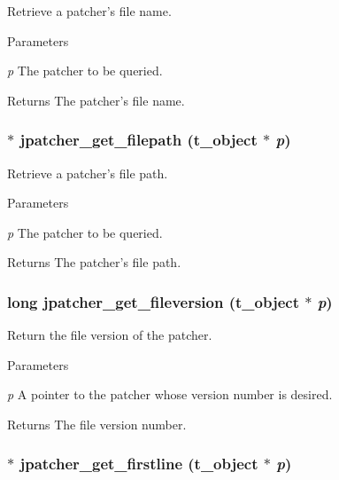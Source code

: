 Retrieve a patcher's file name. 
\begin{DoxyParams}{Parameters}
\item[{\em p}]The patcher to be queried. \end{DoxyParams}
\begin{DoxyReturn}{Returns}
The patcher's file name. 
\end{DoxyReturn}
\hypertarget{group__jpatcher_gac278d621dc1eef9e3b0dbddfc6bf3f53}{
\subsubsection[{jpatcher\_\-get\_\-filepath}]{$\ast$ jpatcher\_\-get\_\-filepath ({\bf t\_\-object} $\ast$ {\em p})}}
\label{group__jpatcher_gac278d621dc1eef9e3b0dbddfc6bf3f53}


Retrieve a patcher's file path. 
\begin{DoxyParams}{Parameters}
\item[{\em p}]The patcher to be queried. \end{DoxyParams}
\begin{DoxyReturn}{Returns}
The patcher's file path. 
\end{DoxyReturn}
\hypertarget{group__jpatcher_gaac7f1696b3346197cb8f1c0dac954780}{
\subsubsection[{jpatcher\_\-get\_\-fileversion}]{\setlength{\rightskip}{0pt plus 5cm}long jpatcher\_\-get\_\-fileversion ({\bf t\_\-object} $\ast$ {\em p})}}
\label{group__jpatcher_gaac7f1696b3346197cb8f1c0dac954780}


Return the file version of the patcher. 
\begin{DoxyParams}{Parameters}
\item[{\em p}]A pointer to the patcher whose version number is desired. \end{DoxyParams}
\begin{DoxyReturn}{Returns}
The file version number. 
\end{DoxyReturn}
\hypertarget{group__jpatcher_ga5d110fdbf8797e9d0edfa1e47afdc691}{
\subsubsection[{jpatcher\_\-get\_\-firstline}]{$\ast$ jpatcher\_\-get\_\-firstline ({\bf t\_\-object} $\ast$ {\em p})}}
\label{group__jpatcher_ga5d110fdbf8797e9d0edfa1e47afdc691}


